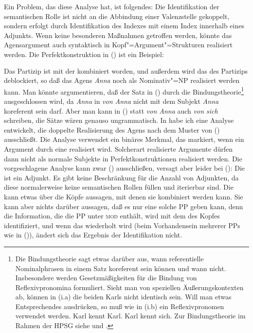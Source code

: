 {Ein Problem, das diese Analyse hat, ist folgendes: Die Identifikation der semantischen Rolle
ist nicht an die Abbindung einer Valenzstelle gekoppelt, sondern erfolgt durch Identifikation
des Indexes mit einem Index innerhalb eines Adjunkts. Wenn keine besonderen Maßnahmen getroffen
werden, könnte das Agensargument auch syntaktisch in Kopf"=Argument"=Strukturen realisiert werden.
Die Perfektkonstruktion in () ist ein Beispiel: 

\z
Das Partizip ist mit der \vonpp kombiniert worden, und außerdem wird das \subj des Partizips
deblockiert, so daß das Agens \emph{Anna} noch als Nominativ"=NP realisiert werden kann.
Man könnte argumentieren, daß der Satz in () durch die Bindungstheorie\footnote{
  Die Bindungstheorie sagt etwas darüber aus, wann referentielle Nominalphrasen in einem Satz
  koreferent sein können und wann nicht. Insbesondere werden Gesetzmäßigkeiten für die
  Bindung von Reflexivpronomina formuliert. Sieht man von speziellen Äußerungskontexten ab,
  können in (i.a) die beiden Karls nicht identisch sein.
  Will man etwas Entsprechendes ausdrücken, so muß wie in (i.b) ein Reflexivpronomen verwendet werden.
\eal
\ex Karl kennt Karl.
\ex Karl kennt sich.
\zl
  Zur Bindungstheorie im Rahmen der HPSG siehe  und .%
} ausgeschlossen wird, da \emph{Anna} in \emph{von Anna} nicht mit dem Subjekt \emph{Anna} koreferent sein darf.
Aber man kann in () statt \emph{von Anna} auch \emph{von sich} schreiben, 
die Sätze wären genauso ungrammatisch. In  habe ich eine Analyse entwickelt,
die doppelte Realisierung des Agens nach dem Muster von () ausschließt. Die Analyse
verwendet ein binäres Merkmal, das markiert, wenn ein Argument durch eine \vonpp realisiert
wird. Solcherart realisierte Argumente dürfen dann nicht als normale Subjekte in Perfektkonstruktionen
realisiert werden. Die vorgeschlagene Analyse kann zwar () ausschließen, versagt aber
leider bei ():
\eal
{}
\zl
Die \vonpp ist ein Adjunkt. Es gibt keine Beschränkung für die Anzahl von Adjunkten, da
diese normalerweise keine semantischen Rollen füllen und iterierbar sind. Die \vonpp kann etwas über die Köpfe
aussagen, mit denen sie kombiniert werden kann. Sie kann aber nichts darüber aussagen, daß
es nur eine solche PP geben kann, denn die Information, die die PP unter \textsc{mod} enthält, wird mit dem
\synsemw des Kopfes identifiziert, und wenn das wiederholt wird (beim Vorhandensein mehrerer PPs wie
in ()), ändert sich das Ergebnis der Identifikation nicht.

}
